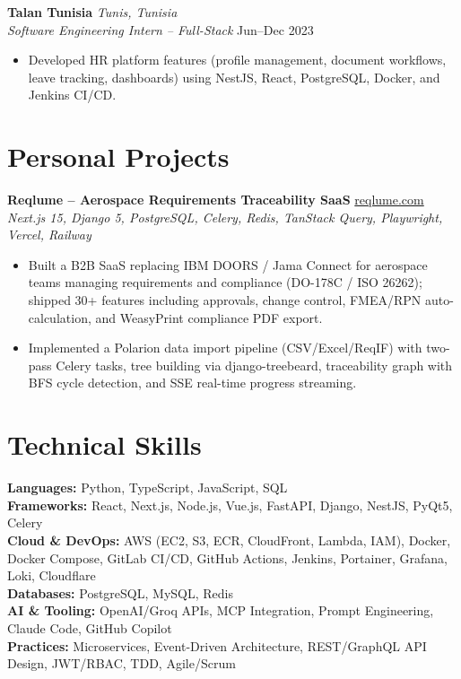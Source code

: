 \documentclass[a4paper,10pt]{article}
\newcommand{\role}[4]{%
\textbf{#1} \hfill \textit{#2}\\%
\textit{#3} \hfill #4%
\vspace{1pt}%
}
\newenvironment{bullets}{%
\begin{itemize}[leftmargin=12pt, itemsep=1pt, topsep=2pt, parsep=0pt, label={--}]%
}{%
\end{itemize}%
}
\begin{document}
\role{Talan Tunisia}{Tunis, Tunisia}{Software Engineering Intern -- Full-Stack}{Jun--Dec 2023}
\begin{bullets}
\item Developed HR platform features (profile management, document workflows, leave tracking, dashboards) using NestJS, React, PostgreSQL, Docker, and Jenkins CI/CD.
\end{bullets}

\section*{Personal Projects}

\textbf{Reqlume -- Aerospace Requirements Traceability SaaS} \hfill \href{https://reqlume.com}{reqlume.com}\\
\textit{\small Next.js 15, Django 5, PostgreSQL, Celery, Redis, TanStack Query, Playwright, Vercel, Railway}
\begin{bullets}
\item Built a B2B SaaS replacing IBM DOORS / Jama Connect for aerospace teams managing requirements and compliance (DO-178C / ISO 26262); shipped 30+ features including approvals, change control, FMEA/RPN auto-calculation, and WeasyPrint compliance PDF export.
\item Implemented a Polarion data import pipeline (CSV/Excel/ReqIF) with two-pass Celery tasks, tree building via django-treebeard, traceability graph with BFS cycle detection, and SSE real-time progress streaming.
\end{bullets}

\section*{Technical Skills}
\textbf{Languages:} Python, TypeScript, JavaScript, SQL\\
\textbf{Frameworks:} React, Next.js, Node.js, Vue.js, FastAPI, Django, NestJS, PyQt5, Celery\\
\textbf{Cloud \& DevOps:} AWS (EC2, S3, ECR, CloudFront, Lambda, IAM), Docker, Docker Compose, GitLab CI/CD, GitHub Actions, Jenkins, Portainer, Grafana, Loki, Cloudflare\\
\textbf{Databases:} PostgreSQL, MySQL, Redis\\
\textbf{AI \& Tooling:} OpenAI/Groq APIs, MCP Integration, Prompt Engineering, Claude Code, GitHub Copilot\\
\textbf{Practices:} Microservices, Event-Driven Architecture, REST/GraphQL API Design, JWT/RBAC, TDD, Agile/Scrum
\end{document}
